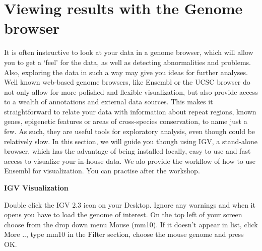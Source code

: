 \section{Viewing results with the Genome browser}

\begin{information}
It is often instructive to look at your data in a genome browser, which will allow you to get a `feel' for the data, as well as detecting
abnormalities and problems. Also, exploring the data in such a way may give you
ideas for further analyses. Well known web-based genome browsers, like Ensembl or
the UCSC browser do not only allow for more polished and flexible visualization, but also provide access
to a wealth of annotations and external data sources. This makes it straightforward to relate your data with information about repeat regions, known genes, epigenetic features or areas of cross-species conservation, to name just
a few. As such, they are useful tools for exploratory analysis, even though could be relatively slow. In this section, we will guide you though using IGV, a stand-alone browser, which has the advantage of being installed locally, easy to use and fast access to visualize your in-house data. We alo provide the workflow of how to use Ensembl for visualization. You can practise after the workshop. 

\end{information}


\begin{steps}
\textbf{IGV Visualization}

Double click the IGV 2.3 icon on your Desktop. Ignore any warnings and when it opens you have to load the genome of interest.
On the top left of your screen choose from the drop down menu Mouse (mm10). If it doesn’t appear in list, click More .., type mm10 in the Filter section, choose the mouse
genome and press OK. 
\end{steps}


